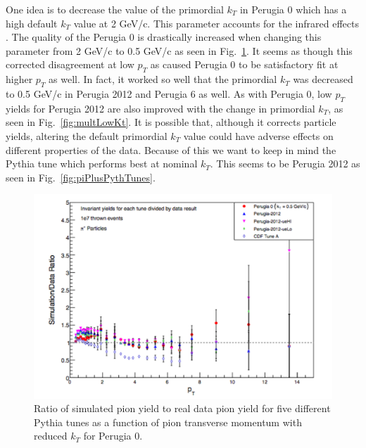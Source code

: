 \documentclass[letterpaper, abstract = on,listof=totoc, bibliography=totoc]{scrreprt}
\begin{document}
\begin{appendices}
One idea is to decrease the value of the primordial $k_T$ in Perugia 0 which has a high default $k_T$ value at 2 GeV/c. This parameter accounts for the infrared effects \cite{pythTunes}. The quality of the Perugia 0 is drastically increased when changing this parameter from 2 GeV/c to 0.5 GeV/c as seen in Fig.~\ref{fig:pythTunesLowKt}. It seems as though this corrected disagreement at low $p_T$ as caused Perugia 0 to be satisfactory fit at higher $p_T$ as well. In fact, it worked so well that the primordial $k_T$ was decreased to 0.5 GeV/c in Perugia 2012 and Perugia 6 as well. As with Perugia 0, low $p_T$ yields for Perugia 2012 are also improved with the change in primordial $k_T$, as seen in Fig.~\ref{fig:multLowKt}. It is possible that, although it corrects particle yields, altering the default primordial $k_T$ value could have adverse effects on different properties of the data. Because of this we want to keep in mind the Pythia tune which performs best at nominal $k_T$. This seems to be Perugia 2012 as seen in Fig.~\ref{fig:piPlusPythTunes}.

\begin{figure}
\begin{center}
\includegraphics[width = .75\textwidth]{pythiaTunesLowKt}
\caption[]{Ratio of simulated pion yield to real data pion yield for five different Pythia tunes as a function of pion transverse momentum with reduced $k_T$ for Perugia 0.}
\label{fig:pythTunesLowKt}
\end{center}
\end{figure}


\end{appendices}
\end{document}
